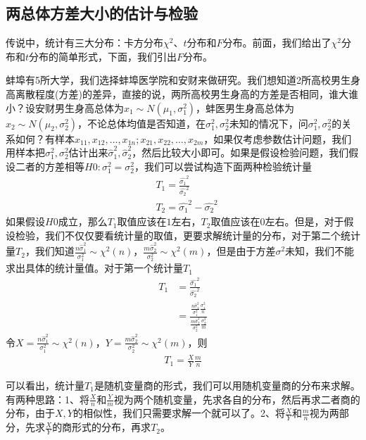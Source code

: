     \subsection{两总体方差大小的估计与检验}
        \label{sub:两总体方差大小的估计与检验}
        \par
        传说中，统计有三大分布：卡方分布$\chi^2$、$t$分布和$F$分布。前面，我们给出了$\chi^2$分布和$t$分布的简单形式，下面，我们引出$F$分布。
        \par
        蚌埠有5所大学，我们选择蚌埠医学院和安财来做研究。我们想知道2所高校男生身高离散程度(方差)的差异，直接的说，两所高校男生身高的方差是否相同，谁大谁小？设安财男生身高总体为$x_1 \sim N(\mu_1,\sigma_1^2)$，蚌医男生身高总体为$x_2\sim N(\mu_2,\sigma_2^2)$，不论总体均值是否知道，在$\sigma_1^2,\sigma_2^2$未知的情况下，问$\sigma_1^2,\sigma_2^2$的关系如何？有样本$x_{11},x_{12},\dots,x_{1n};x_{21},x_{22},\dots,x_{2m}$，如果仅考虑参数估计问题，我们用样本把$\sigma_1^2,\sigma_2^2$估计出来$\hat{\sigma}_1^2,\hat{\sigma}_2^2$，然后比较大小即可。如果是假设检验问题，我们假设二者的方差相等$H0:\sigma_1^2=\sigma_2^2$，我们可以尝试构造下面两种检验统计量
        \begin{align*}
        &T_1 = \frac{\hat{\sigma_1}^2}{\hat{\sigma_2}^2}\\
        &T_2 = \hat{\sigma_1}^2 - \hat{\sigma_2}^2
        \end{align*}
        如果假设$H0$成立，那么$T_1$取值应该在$1$左右，$T_2$取值应该在$0$左右。但是，对于假设检验，我们不仅仅要看统计量的取值，更要求解统计量的分布，对于第二个统计量$T_2$，我们知道$\frac{n\hat{\sigma}_1^2}{\sigma_1^2} \sim \chi^2(n)$，$\frac{m\hat{\sigma}_2^2}{\sigma_2^2} \sim \chi^2(m)$，但是由于方差$\sigma^2$未知，我们不能求出具体的统计量值。对于第一个统计量$T_1$
        \begin{align*}
        T_1 &= \frac{\hat{\sigma_1}^2}{\hat{\sigma_2}^2}\\
        &=\frac{\frac{n\hat{\sigma}_1^2}{\sigma_1^2}\frac{\sigma_1^2}{n}}{\frac{m\hat{\sigma}_2^2}{\sigma_2^2}\frac{\sigma_2^2}{m}}
        \end{align*}
        令$X = \frac{n\hat{\sigma}_1^2}{\sigma_1^2} \sim \chi^2(n)$，$Y=\frac{m\hat{\sigma}_2^2}{\sigma_2^2} \sim \chi^2(m)$，则
        \begin{align*}
        T_1 = \frac{X}{Y}\frac{m}{n}
        \end{align*}
        \par
        可以看出，统计量$T_1$是随机变量商的形式，我们可以用随机变量商的分布来求解。有两种思路：1、将$\frac{X}{n}$和$\frac{Y}{m}$视为两个随机变量，先求各自的分布，然后再求二者商的分布，由于$X,Y$的相似性，我们只需要求解一个就可以了。2、将$\frac{X}{Y}$和$\frac{m}{n}$视为两部分，先求$\frac{X}{Y}$的商形式的分布，再求$T_2$。
